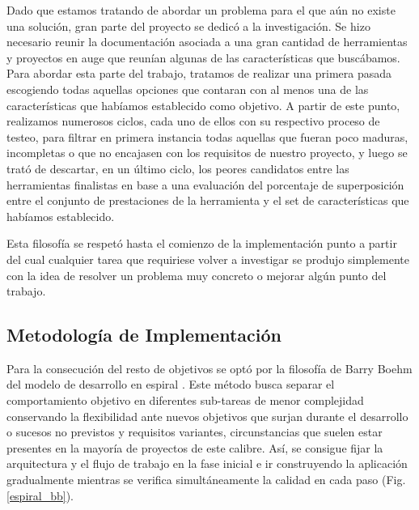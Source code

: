 Dado que estamos tratando de abordar un problema para el que aún no existe una solución, gran parte del proyecto se dedicó a la investigación. Se hizo necesario reunir la documentación asociada a una gran cantidad de herramientas y proyectos en auge que reunían algunas de las características que buscábamos. Para abordar esta parte del trabajo, tratamos de realizar una primera pasada escogiendo todas aquellas opciones que contaran con al menos una de las características que habíamos establecido como objetivo. A partir de este punto, realizamos numerosos ciclos, cada uno de ellos con su respectivo proceso de testeo, para filtrar en primera instancia todas aquellas que fueran poco maduras, incompletas o que no encajasen con los requisitos de nuestro proyecto, y luego se trató de descartar, en un último ciclo, los peores candidatos entre las herramientas finalistas en base a una evaluación del porcentaje de superposición entre el conjunto de prestaciones de la herramienta y el set de características que habíamos establecido.

Esta filosofía se respetó hasta el comienzo de la implementación punto a partir del cual cualquier tarea que requiriese volver a investigar se produjo simplemente con la idea de resolver un problema muy concreto o mejorar algún punto del trabajo.

\subsection{Metodología de Implementación}

Para la consecución del resto de objetivos se optó por la filosofía de Barry Boehm del modelo de desarrollo en espiral \cite{BB1986}. Este método busca separar el comportamiento objetivo en diferentes sub-tareas de menor complejidad conservando la flexibilidad ante nuevos objetivos que surjan durante el desarrollo o sucesos no previstos y requisitos variantes, circunstancias que suelen estar presentes en la mayoría de proyectos de este calibre. Así, se consigue fijar la arquitectura y el flujo de trabajo en la fase inicial e ir construyendo la aplicación gradualmente mientras se verifica simultáneamente la calidad en cada paso (Fig. \ref{espiral_bb}).

